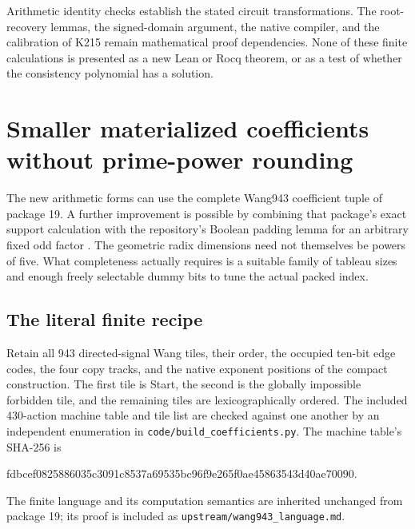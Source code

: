 \documentclass[11pt,letterpaper]{article}
\theoremstyle{remark}
\begin{document}
Arithmetic identity checks establish the stated circuit transformations.
The root-recovery lemmas, the signed-domain argument, the native compiler,
and the calibration of K215 remain mathematical proof dependencies. None
of these finite calculations is presented as a new Lean or Rocq theorem,
or as a test of whether the consistency polynomial has a solution.


\section{Smaller materialized coefficients without prime-power rounding}
\label{sec:coefficients}

The new arithmetic forms can use the complete Wang943 coefficient tuple of
package 19.  A further improvement is possible by combining that package's
exact support calculation with the repository's Boolean padding lemma for
an arbitrary fixed odd factor \cite{wang,padding}.  The geometric radix
dimensions need not themselves be powers of five.  What completeness
actually requires is a suitable family of tableau sizes and enough freely
selectable dummy bits to tune the actual packed index.

\subsection{The literal finite recipe}

Retain all 943 directed-signal Wang tiles, their order, the occupied ten-bit
edge codes, the four copy tracks, and the native exponent positions of the
compact construction.  The first tile is Start, the second is the globally
impossible forbidden tile, and the remaining tiles are lexicographically
ordered.  The included 430-action machine table and tile list are checked
against one another by an independent enumeration in
\texttt{code/build\_coefficients.py}.  The machine table's SHA-256 is
\begin{center}\small\ttfamily
fdbcef0825886035c3091c8537a69535bc96f9e265f0ae45863543d40ae70090.
\end{center}
The finite language and its computation semantics are inherited unchanged
from package 19; its proof is included as \texttt{upstream/wang943\_language.md}.
\end{document}
